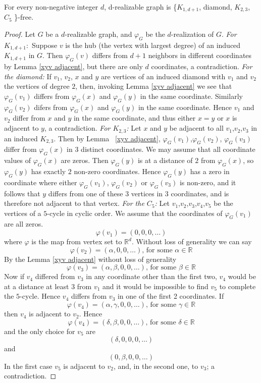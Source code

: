 \documentclass[12pt,a4paper,titlepage,openany]{report}
\begin{document}
\begin{theorem}\label{d-realizable-free}
For every non-negative integer $d$, d-realizable graph is \{$K_{1,d+1}$, diamond,
$K_{2,3}$, $C_5$ \}-free.
\end{theorem} 
\begin{proof} Let $G$ be a $d$-realizable graph, and $\varphi_G$ be the $d$-realization of $G$.\newline
\textit{For $K_{1,d+1}:$} Suppose $v$ is the hub (the vertex with largest degree) of an induced $K_{1,d+1}$ in $G$. Then $\varphi_G(v)$ differs from $d+1$ neighbors in different coordinates by Lemma \ref{xyv adjacent}, but there are only $d$ coordinates, a contradiction.\newline
\textit{For the diamond:} If $v_1$, $v_2$, $x$ and $y$ are vertices of an induced diamond with $v_1$ and $v_2$ the vertices of degree $2$, then, invoking Lemma \ref{xyv adjacent} we see that $\varphi_G(v_1)$ differs from $\varphi_G(x)$ and $\varphi_G(y)$ in the same coordinate. Similarly $\varphi_G(v_2)$ difers from $\varphi_G(x)$ and $\varphi_G(y)$ in the same coordinate. Hence $v_1$ and $v_2$ differ from $x$ and $y$ in the same coordinate, and thus either $x=y$ or $x$ is adjacent to $y$, a contradiction.\newline
\textit{For $K_{2,3}$:} Let $x$ and $y$ be adjacent to all $v_1$,$v_2$,$v_3$ in an induced $K_{2,3}$. Then by Lemma ~\ref{xyv adjacent}, $\varphi_G(v_1)$,$\varphi_G(v_2)$, $\varphi_G(v_3)$ differ from $\varphi_G(x)$ in $3$ distinct coordinates. We may assume that all coordinate values of $\varphi_G(x)$ are zeros. Then $\varphi_G(y)$ is at a distance of $2$ from $\varphi_G(x)$, so $\varphi_G(y)$ has exactly $2$ non-zero coordinates. Hence $\varphi_G(y)$ has a zero in coordinate where either $\varphi_G(v_1)$, $\varphi_G(v_2)$ or $\varphi_G(v_3)$ is non-zero, and it follows that $y$ differs from one of these $3$ vertices in $3$ coordinates, and is therefore not adjacent to that vertex.\newline
\textit{For the $C_5$:} Let $v_1$,$v_2$,$v_3$,$v_4$,$v_5$ be the vertices of a $5$-cycle in cyclic order. We assume that the coordinates of $\varphi_G(v_1)$ are all zeros.
$$\varphi (v_1)=(0,0,0,\ldots)$$ where $\varphi$ is the map from vertex set to $\mathbb{R}^d$.\newline
Without loss of generality we can say
$$\varphi (v_2)=(\alpha,0,0,\ldots) \text{, for some } \alpha \in \mathbb{R} $$
By the Lemma \ref{xyv adjacent} without loss of generality
$$\varphi (v_3)=(\alpha,\beta,0,0,\ldots) \text{, for some } \beta \in \mathbb{R}$$
Now if $v_4$ differed from $v_3$ in any coordinate other than the first two, $v_4$ would be at a distance at least $3$ from $v_1$ and it would be impossible to find $v_5$ to complete the $5$-cycle. Hence $v_4$ differs from $v_3$ in one of the first 2 coordinates. If 
$$\varphi (v_4)=(\alpha,\gamma,0,0,\ldots) \text{, for some } \gamma \in \mathbb{R}$$
then $v_4$ is adjacent to $v_2$. Hence
$$\varphi (v_4)=(\delta,\beta,0,0,\ldots) \text{, for some } \delta \in \mathbb{R}$$
and the only choice for $v_5$ are
$$(\delta,0,0,0,\ldots)$$
and 
$$(0,\beta,0,0,\ldots)$$
In the first case $v_5$ is adjacent to $v_2$, and, in the  second one, to $v_3$; a contradiction.
 
\end{proof}
\end{document}
